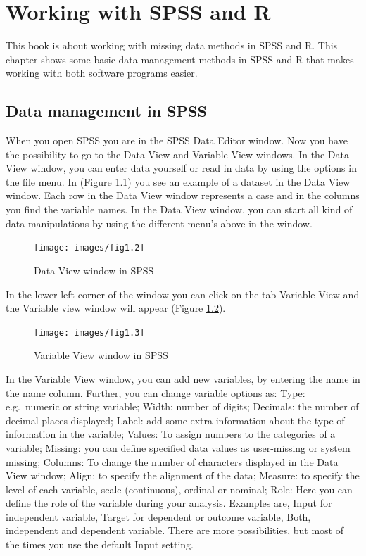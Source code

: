 \documentclass[
]{book}
\begin{document}
\hypertarget{working-with-spss-and-r}{%
\chapter{Working with SPSS and R}\label{working-with-spss-and-r}}

This book is about working with missing data methods in SPSS and R. This chapter shows some basic data management methods in SPSS and R that makes working with both software programs easier.

\hypertarget{data-management-in-spss}{%
\section{Data management in SPSS}\label{data-management-in-spss}}

When you open SPSS you are in the SPSS Data Editor window. Now you have the possibility to go to the Data View and Variable View windows. In the Data View window, you can enter data yourself or read in data by using the options in the file menu. In (Figure \ref{fig:fig2}) you see an example of a dataset in the Data View window. Each row in the Data View window represents a case and in the columns you find the variable names. In the Data View window, you can start all kind of data manipulations by using the different menu's above in the window.

\begin{figure}

{\centering \texttt{[image: images/fig1.2]} 

}

\caption{Data View window in SPSS}\label{fig:fig2}
\end{figure}

In the lower left corner of the window you can click on the tab Variable View and the Variable view window will appear (Figure \ref{fig:fig3}).

\begin{figure}

{\centering \texttt{[image: images/fig1.3]} 

}

\caption{Variable View window in SPSS}\label{fig:fig3}
\end{figure}

In the Variable View window, you can add new variables, by entering the name in the name column. Further, you can change variable options as: Type: e.g.~numeric or string variable; Width: number of digits; Decimals: the number of decimal places displayed; Label: add some extra information about the type of information in the variable; Values: To assign numbers to the categories of a variable; Missing: you can define specified data values as user-missing or system missing; Columns: To change the number of characters displayed in the Data View window; Align: to specify the alignment of the data; Measure: to specify the level of each variable, scale (continuous), ordinal or nominal; Role: Here you can define the role of the variable during your analysis. Examples are, Input for independent variable, Target for dependent or outcome variable, Both, independent and dependent variable. There are more possibilities, but most of the times you use the default Input setting.
\end{document}
